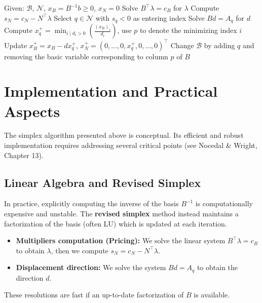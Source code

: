 \begin{algorithm}[H]
    \caption{One step of the Simplex Method}
    \SetAlgoLined
    Given: $\mathcal{B}$, $\mathcal{N}$, $x_B=B^{-1}b\geq 0$, $x_N=0$\;
    Solve $B^\top\lambda = c_B$ for $\lambda$\;
    Compute $s_N=c_N - N^\top\lambda$\; 
    Select $q\in\mathcal{N}$ with $s_q<0$ as entering index\;
    Solve $Bd=A_q$ for $d$\;
    Compute $x_q^+=\min_{i \mid d_i> 0}\left(\frac{(x_B)_i}{d_i}\right)$, use $p$ to denote the minimizing index $i$\;
    Update $x_B^+=x_B - d x_q^+$, $x_N^+=(0, \ldots, 0, x_q^+, 0, \ldots, 0)^\top$\;
    Change $\mathcal{B}$ by adding $q$ and removing the basic variable corresponding to column $p$ of $B$\;
\end{algorithm}

\section{Implementation and Practical Aspects}

The simplex algorithm presented above is conceptual. Its efficient and robust implementation requires addressing several critical points (see Nocedal \& Wright, Chapter 13).

\subsection{Linear Algebra and Revised Simplex}
In practice, explicitly computing the inverse of the basis $B^{-1}$ is computationally expensive and unstable. The \textbf{revised simplex} method instead maintains a factorization of the basis (often LU) which is updated at each iteration.
\begin{itemize}
    \item \textbf{Multipliers computation (Pricing):} We solve the linear system $B^\top \lambda = c_B$ to obtain $\lambda$, then we compute $s_N = c_N - N^\top \lambda$.
    \item \textbf{Displacement direction:} We solve the system $Bd = A_q$ to obtain the direction $d$.
\end{itemize}
These resolutions are fast if an up-to-date factorization of $B$ is available.

